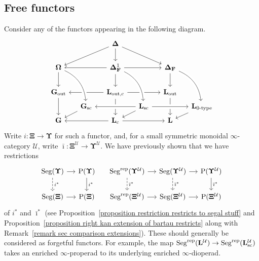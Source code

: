 \documentclass{amsart}
\numberwithin{theorem}{subsection}
\theoremstyle{definition}
\newcommand{\finsetskel}{\mathbf{F}}
\newcommand{\xU}{\mathcal{U}}
\newcommand{\Pre}{\name{P}}
\newcommand{\name}[1]{\ensuremath{\text{\textup{#1}}}}
\newcommand{\simp}{\mathbf{\Delta}}
\newcommand{\bbO}{\mathbf{\Omega}}
\newcommand{\levelg}{\mathbf{L}}
\newcommand{\levelU}{\levelg^\xU}
\newcommand{\levelgconn}{\levelg_{\name{c}}}
\newcommand{\bbY}{\mathbf{G}}
\newcommand{\bbYout}{\bbY_{\name{out}}}
\newcommand{\gc}{\mathbf{\Xi}}
\newcommand{\gcone}{\gc}
\newcommand{\gctwo}{\mathbf{\Upsilon}}
\newcommand{\gcUone}{\gcone^\xU}
\newcommand{\gcUtwo}{\gctwo^\xU}
\newcommand{\bariustar}{\bar \imath^*}
\newcommand{\Seg}{\name{Seg}}
\newcommand{\Segrep}{\Seg^{\name{rep}}}
\begin{document}
\subsection{Free functors}\label{section free functors}
Consider any of the functors appearing in the following diagram.
\begin{equation}\label{eq big diagram of graph cats}
\begin{tikzcd}[column sep=small]
& & \simp \arrow[drr] \arrow[dll] \dar \\
\bbO \dar & & \simp_\finsetskel^1 \dar \arrow[rr] \arrow[ll]& & \simp_\finsetskel \dar \\
\bbYout \arrow[dd] & & \levelg_{\name{out,c}} \arrow[rr] \arrow[ll]\arrow[dd] & & \levelg_{\name{out}} \arrow[dd] \\[-1.5em]
& \bbY_{\name{sc}} \arrow[from=uul, bend left, crossing over]\arrow[dl] & & \levelg_{\name{sc}} \arrow[from=uul, bend left, crossing over]\arrow[dl] \arrow[rr, crossing over] \arrow[ll, crossing over]& & \levelg_{\name{0-type}} \arrow[from=uul, bend left, crossing over]\arrow[dl] \\[-1.5em]
\bbY & & \levelgconn \arrow[rr] \arrow[ll]& & \levelg 
\end{tikzcd} \end{equation}
Write $i \colon \gcone \to \gctwo$ for such a functor, and, for a small symmetric monoidal $\infty$-category $\xU$, write $\bar\imath \colon \gcUone \to \gcUtwo$.
We have previously shown that we have restrictions
\begin{equation}\label{eq restrictions of middle functor}
\begin{tikzcd}[column sep=small]
\Seg(\gctwo) \dar[dashed,"i^*"] \rar & \Pre(\gctwo) \dar{i^*} & \Segrep(\gcUtwo) \dar[dashed, "\bariustar"] \rar & \Seg(\gcUtwo) \dar[dashed, "\bariustar"] \rar & \Pre(\gcUtwo) \dar{\bariustar} \\
\Seg(\gcone) \rar & \Pre(\gcone) & \Segrep(\gcUone) \rar & \Seg(\gcUone) \rar & \Pre(\gcUone)
\end{tikzcd} 
\end{equation}
of $i^*$ and $\bariustar$ (see Proposition~\ref{proposition restriction restricts to segal stuff} and Proposition~\ref{proposition right kan extension of bartau restricts} along with Remark~\ref{remark sec comparison extensions}).
These should generally be considered as forgetful functors.
For example, the map $\Segrep(\levelU) \to \Segrep(\levelg_{\name{sc}}^\xU)$ takes an enriched $\infty$-properad to its underlying enriched $\infty$-dioperad.
\end{document}
